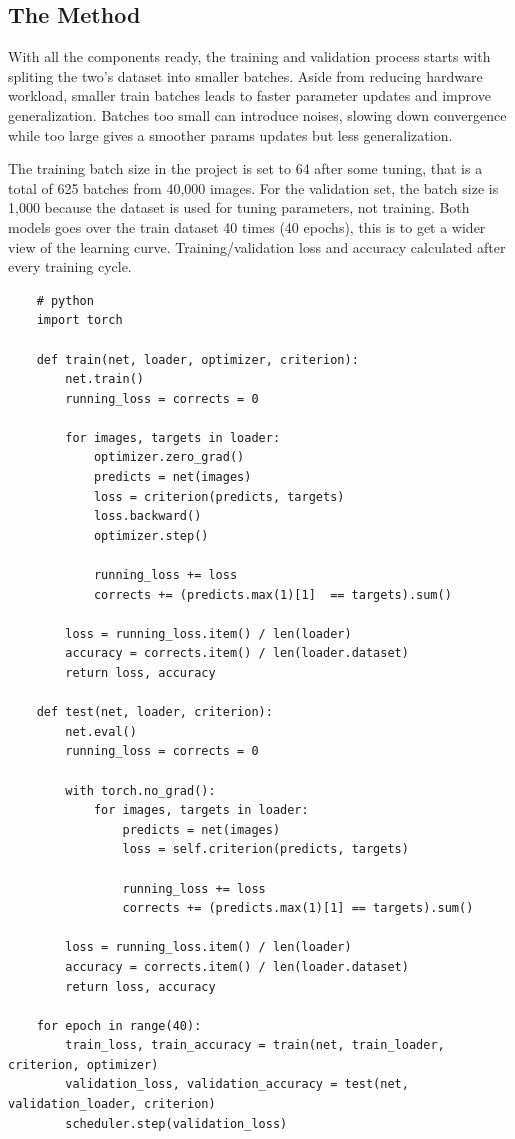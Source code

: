 \documentclass{report}
\begin{document}
\subsection{The Method}
With all the components ready, the training and validation process starts with spliting the two's dataset into 
smaller batches. Aside from reducing hardware workload, smaller train batches leads to faster parameter updates 
and improve generalization. Batches too small can introduce noises, slowing down convergence while too large 
gives a smoother params updates but less generalization. 

The training batch size in the project is set to 64 after some tuning, that is a total of 625 batches from 40,000 
images. For the validation set, the batch size is 1,000 because the dataset is used for tuning parameters, not 
training. Both models goes over the train dataset 40 times (40 epochs), this is to get a wider view of the learning 
curve. Training/validation loss and accuracy calculated after every training cycle.

\begin{verbatim}
    # python
    import torch

    def train(net, loader, optimizer, criterion):
        net.train()
        running_loss = corrects = 0

        for images, targets in loader:
            optimizer.zero_grad()
            predicts = net(images)
            loss = criterion(predicts, targets)
            loss.backward()
            optimizer.step()

            running_loss += loss
            corrects += (predicts.max(1)[1]  == targets).sum()

        loss = running_loss.item() / len(loader)
        accuracy = corrects.item() / len(loader.dataset)
        return loss, accuracy

    def test(net, loader, criterion):
        net.eval()
        running_loss = corrects = 0
        
        with torch.no_grad():
            for images, targets in loader:
                predicts = net(images)
                loss = self.criterion(predicts, targets)

                running_loss += loss
                corrects += (predicts.max(1)[1] == targets).sum()

        loss = running_loss.item() / len(loader)
        accuracy = corrects.item() / len(loader.dataset)
        return loss, accuracy

    for epoch in range(40):
        train_loss, train_accuracy = train(net, train_loader, criterion, optimizer)
        validation_loss, validation_accuracy = test(net, validation_loader, criterion)
        scheduler.step(validation_loss)
\end{verbatim}
\end{document}
